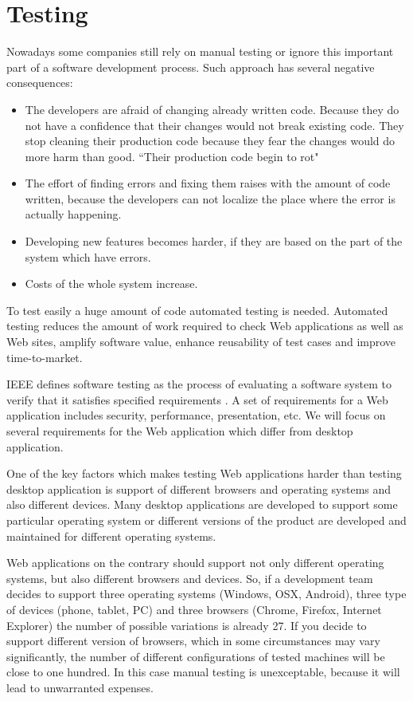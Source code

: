 \section{Testing}
		Nowadays some companies still rely on manual testing or ignore this
		important part of a software development process. Such approach has several
		negative consequences:
		\begin{itemize}
			\item The developers are afraid of changing already written
			code. Because they do not have a confidence that their changes would not 
			break existing code. They stop cleaning their production code because they
			fear the changes would do more harm than good. ``Their production code begin
			to rot"
			\cite[p.123]{cleancode} 
			
			\item The effort of finding errors and	fixing them raises with the amount of
			code written, because the developers can not localize the place where the
			error is actually happening.
			\item Developing new features becomes harder, if they are based on the part
			of the system which have errors.
		
			\item Costs of the whole system increase.
	 	 \end{itemize}
	 	 
	 	 To test easily a huge amount of code automated testing is needed.	
	 	 Automated testing reduces the amount of work required to check Web applications as
	 	 well as Web sites, amplify software value, enhance reusability of test cases and improve time-to-market.
	   
		IEEE defines software testing as the process of evaluating a software
		system to verify that it satisfies specified requirements \cite{Xu1}. A set of
		requirements for a Web application includes security, performance,
		presentation, etc. We will focus on several requirements for the Web
		application which differ from desktop application. 
		
		One of the key factors which makes testing Web applications harder than
		testing desktop application is support of different browsers and operating systems and also
		different devices. Many desktop applications are developed to support some
		particular operating system or different versions of the product are developed
		and maintained for different operating systems. 
		
		Web applications on the	contrary should support not only different operating systems, but also
		different browsers and devices. So, if a development team decides to support
		three operating systems (Windows, OSX, Android), three type of devices (phone,
		tablet, PC) and three browsers (Chrome, Firefox, Internet Explorer) the number
		of possible variations is already 27. If you decide to support
		different version of browsers, which in some circumstances may vary significantly,
		the number of different configurations of tested machines will be close to
		one hundred. In this case manual testing is unexceptable, because it will lead
		to unwarranted expenses. 
		
